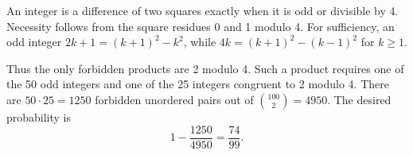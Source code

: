 An integer is a difference of two squares exactly when it is odd or divisible by 4. Necessity follows from the square residues 0 and 1 modulo 4. For sufficiency, an odd integer $2k+1=(k+1)^2-k^2$, while $4k=(k+1)^2-(k-1)^2$ for $k\ge1$.

Thus the only forbidden products are 2 modulo 4. Such a product requires one of the 50 odd integers and one of the 25 integers congruent to 2 modulo 4. There are $50\cdot25=1250$ forbidden unordered pairs out of $\binom{100}{2}=4950$. The desired probability is
\[1-\dfrac{1250}{4950}=\boxed{\dfrac{74}{99}}.\]
